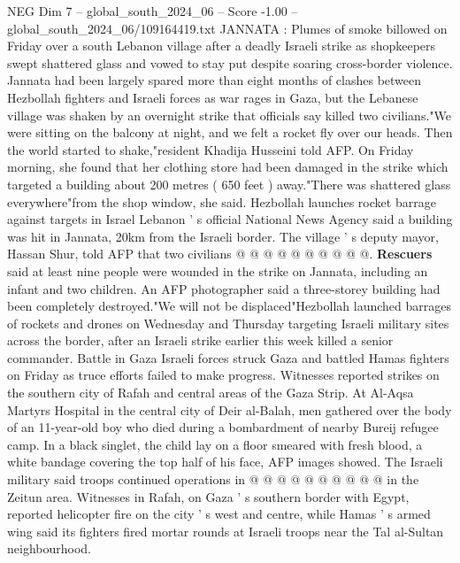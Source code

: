 \begin{textsample}{NEG Dim 7 – global\_south\_2024\_06 – Score -1.00 – global\_south\_2024\_06/109164419.txt}  \label{ex:f7_neg_212}
JANNATA : Plumes of smoke billowed on Friday over a south Lebanon village after a deadly Israeli strike as shopkeepers swept shattered glass and vowed to stay put despite soaring cross-border violence.
Jannata had been largely spared more than eight months of clashes between Hezbollah fighters and Israeli forces as war rages in Gaza, but the Lebanese village was shaken by an overnight strike that officials say killed two civilians."We were sitting on the balcony at night, and we felt a rocket fly over our heads.
Then the world started to shake,"resident Khadija Husseini told AFP.
On Friday morning, she found that her clothing store had been damaged in the strike which targeted a building about 200 metres ( 650 feet ) away."There was shattered glass everywhere"from the shop window, she said.
Hezbollah launches rocket barrage against targets in Israel Lebanon ' s official National News Agency said a building was hit in Jannata, 20km from the Israeli border.
The village ' s deputy mayor, Hassan Shur, told AFP that two civilians @ @ @ @ @ @ @ @ @ @. \textbf{Rescuers} said at least nine people were wounded in the strike on Jannata, including an infant and two children.
An AFP photographer said a three-storey building had been completely destroyed."We will not be displaced"Hezbollah launched barrages of rockets and drones on Wednesday and Thursday targeting Israeli military sites across the border, after an Israeli strike earlier this week killed a senior commander.
Battle in Gaza Israeli forces struck Gaza and battled Hamas fighters on Friday as truce efforts failed to make progress.
Witnesses reported strikes on the southern city of Rafah and central areas of the Gaza Strip.
At Al-Aqsa Martyrs Hospital in the central city of Deir al-Balah, men gathered over the body of an 11-year-old boy who died during a bombardment of nearby Bureij refugee camp.
In a black singlet, the child lay on a floor smeared with fresh blood, a white bandage covering the top half of his face, AFP images showed.
The Israeli military said troops continued operations in @ @ @ @ @ @ @ @ @ @ in the Zeitun area.
Witnesses in Rafah, on Gaza ' s southern border with Egypt, reported helicopter fire on the city ' s west and centre, while Hamas ' s armed wing said its fighters fired mortar rounds at Israeli troops near the Tal al-Sultan neighbourhood.

\end{textsample}

